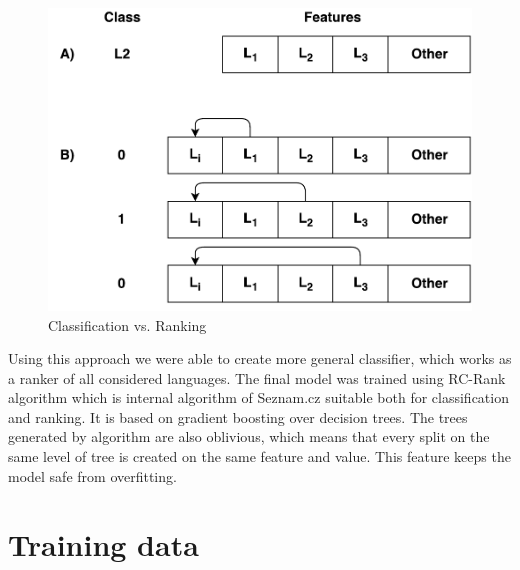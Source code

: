 \documentclass{acm_proc_article-sp}
\begin{document}
  \begin{figure}
      \caption{Classification vs. Ranking} 
     \label{examples} 
 
 \vspace{0.5cm}
      \centering
      \includegraphics[scale=0.5]{multiclass.pdf}
 \end{figure}

  Using this approach we were able to create more general classifier, which works as a ranker of all considered languages.
  The final model was trained using RC-Rank algorithm which is internal algorithm of Seznam.cz suitable both for classification and ranking.
  It is based on gradient boosting over decision trees. The trees generated by algorithm are also oblivious, 
  which means that every split on the same level of tree is created on the same feature and value.
  This feature keeps the model safe from overfitting.

  \section{Training data}
\end{document}
